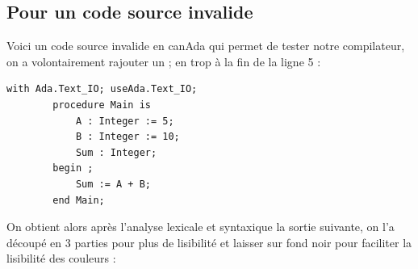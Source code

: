 \documentclass[french,a4paper]{article}
\begin{document}
    \subsection{Pour un code source invalide}\label{subsec:pour-un-code-source-invalide}

    Voici un code source invalide en canAda qui permet de tester notre compilateur, on a volontairement rajouter un ; en trop à la fin de la ligne 5 :

    \begin{lstlisting}[label={lst:lstlisting17}]
        with Ada.Text_IO; useAda.Text_IO;
        procedure Main is
            A : Integer := 5;
            B : Integer := 10;
            Sum : Integer;
        begin ;
            Sum := A + B;
        end Main;
    \end{lstlisting}

    On obtient alors après l'analyse lexicale et syntaxique la sortie suivante, on l'a découpé en 3 parties pour plus de lisibilité et laisser sur fond noir pour faciliter la lisibilité des couleurs :
\end{document}
